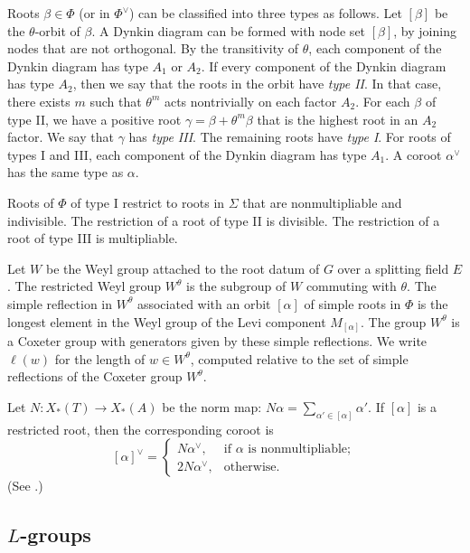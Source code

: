 Roots $\beta\in\Phi$ (or in $\Phi^\vee$)
can be classified into three types as follows.  Let $[\beta]$ be the $\theta$-orbit of $\beta$.
A Dynkin diagram can be formed with node set $[\beta]$, by joining nodes that are not orthogonal.  
By the transitivity of $\theta$,  each component of the Dynkin diagram has type $A_1$
or $A_2$.  If every component of the Dynkin diagram  has type $A_2$, then we say that the roots in the orbit
have {\it type II}.  In that case, there exists $m$ such that  $\theta^m$ acts nontrivially
on each factor $A_2$.   For each $\beta$ of type II, 
we have a positive root $\gamma = \beta+\theta^m\beta$ that is the highest root in an $A_2$ factor.  
We say that $\gamma$ has {\it type III}.
The remaining roots  have {\it type I}.  For roots of
types I and III, each component of the Dynkin diagram has type $A_1$.
A coroot $\alpha^\vee$ has the same type as $\alpha$.

Roots of $\Phi$ of type I restrict to roots in $\Sigma$ that are nonmultipliable and indivisible. 
The restriction of a root of type II is divisible.  The restriction of a root of type III is multipliable.


Let $W$ be the
Weyl group attached to the root datum of $G$ over a splitting field $E$.
The restricted Weyl group $W^\theta$ is the subgroup of $W$
commuting with $\theta$.  The simple reflection in $W^\theta$ 
associated with an orbit $[\alpha]$ of simple roots in $\Phi$ is the
longest element in the Weyl group of the Levi component $M_{[\alpha]}$.
The group $W^\theta$
is a Coxeter group with generators given by these simple reflections.
We write $\ell(w)$ for the length of $w\in W^\theta$, computed relative to the set of simple reflections 
of the Coxeter group $W^\theta$.


Let $N:X_*(T)\to X_*(A)$ be the norm map: $N\alpha = \sum_{\alpha'\in [\alpha]} \alpha'$.
If $[\alpha]$ is a restricted root, then the corresponding coroot is
\begin{equation}\label{eqn:norm}
[\alpha]^\vee = \begin{cases}
N\alpha^\vee,&\text{if $\alpha$ is nonmultipliable};\\
2N \alpha^\vee,&\text{otherwise}.
\end{cases}
\end{equation}
(See \cite[1.3.9]{kottwitz1999foundations}.)




\subsection{$L$-groups}

